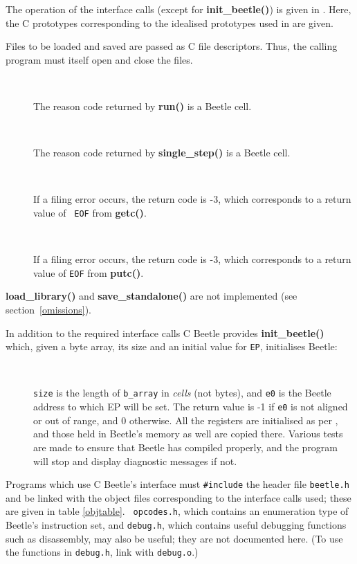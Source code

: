 \documentclass{article}
\newlength{\ifacewidth}\ifacewidth=\textwidth \advance\ifacewidth by -0.1in
\newlength{\innerwidth}\innerwidth=\ifacewidth \advance\innerwidth by -0.5in
\newcommand{\ifacec}[2]{\item[]\parbox{\ifacewidth}{\hspace*{2.5mm}{\tt #1}\\[0.5ex]\hspace*{0.4in}\parbox{\innerwidth}{#2}}}
\begin{document}
The operation of the interface calls (except for {\bf init\_beetle()}) is
given in \cite{beetledis}. Here, the C prototypes corresponding to the idealised
prototypes used in \cite{beetledis} are given.

Files to be loaded and saved are passed as C file descriptors. Thus, the
calling program must itself open and close the files.

\begin{description}
\ifacec{CELL run()}{The reason code returned by {\bf run()} is a Beetle
cell.}
\ifacec{CELL single\_step()}{The reason code returned by {\bf single\_step()}
is a Beetle cell.}
\ifacec{int load\_object(FILE *file, CELL *address)}{If a filing error
occurs, the return code is -3, which corresponds to a return value of {\tt
EOF} from {\bf getc()}.}
\ifacec{int save\_object(FILE *file, CELL *address, UCELL length)}{If a
filing error occurs, the return code is -3, which corresponds to a return
value of {\tt EOF} from {\bf putc()}.}
\end{description}

{\bf load\_library()} and {\bf save\_standalone()} are not implemented (see
section~\ref{omissions}).

In addition to the required interface calls C Beetle provides {\bf
init\_beetle()} which, given a byte array, its size and an initial value for
{\tt EP}, initialises Beetle:

\begin{description}
\ifacec{int init\_beetle(BYTE *b\_array, long size, UCELL e0)}{{\tt size} is
the length of {\tt b\_array} in {\em cells} (not bytes), and {\tt e0} is the
Beetle address to which EP will be set. The return value is -1 if {\tt e0} is
not aligned or out of range, and 0 otherwise. All the registers are
initialised as per \cite{beetledis}, and those held in Beetle's memory as well
are copied there. Various tests are made to ensure that Beetle has compiled
properly, and the program will stop and display diagnostic messages if not.}
\end{description}

Programs which use C Beetle's interface must {\tt \#include} the header file
{\tt beetle.h} and be linked with the object files corresponding to the
interface calls used; these are given in table \ref{objtable}. {\tt
opcodes.h}, which contains an enumeration type of Beetle's instruction set,
and {\tt debug.h}, which contains useful debugging functions such as
disassembly, may also be useful; they are not documented here. (To use the
functions in {\tt debug.h}, link with {\tt debug.o}.)
\end{document}

